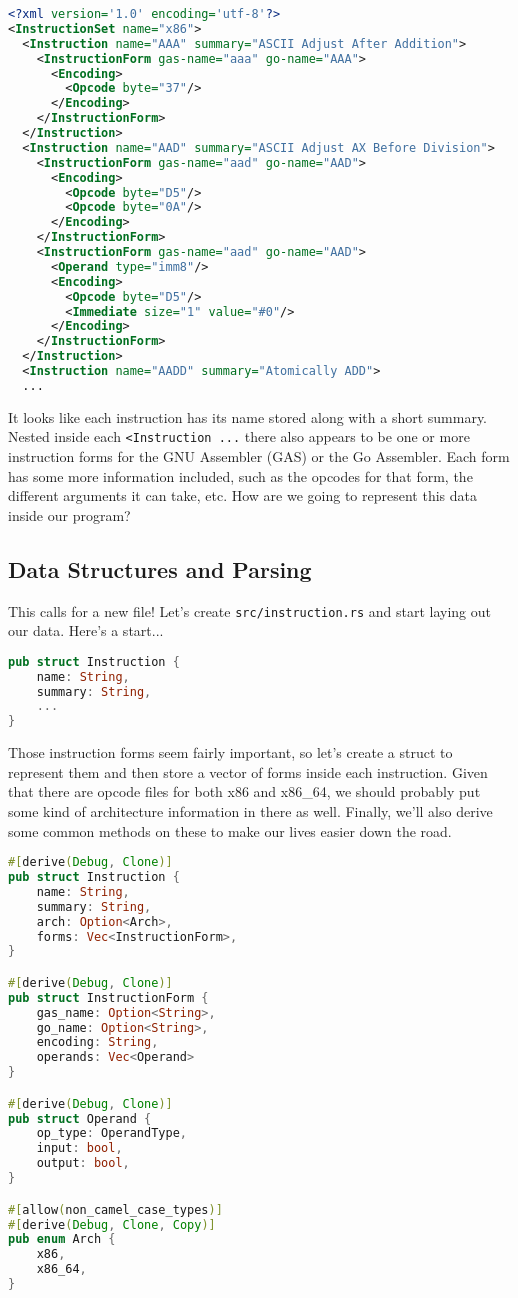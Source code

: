 \begin{lstlisting}[language=xml]
<?xml version='1.0' encoding='utf-8'?>
<InstructionSet name="x86">
  <Instruction name="AAA" summary="ASCII Adjust After Addition">
    <InstructionForm gas-name="aaa" go-name="AAA">
      <Encoding>
        <Opcode byte="37"/>
      </Encoding>
    </InstructionForm>
  </Instruction>
  <Instruction name="AAD" summary="ASCII Adjust AX Before Division">
    <InstructionForm gas-name="aad" go-name="AAD">
      <Encoding>
        <Opcode byte="D5"/>
        <Opcode byte="0A"/>
      </Encoding>
    </InstructionForm>
    <InstructionForm gas-name="aad" go-name="AAD">
      <Operand type="imm8"/>
      <Encoding>
        <Opcode byte="D5"/>
        <Immediate size="1" value="#0"/>
      </Encoding>
    </InstructionForm>
  </Instruction>
  <Instruction name="AADD" summary="Atomically ADD">
  ...
\end{lstlisting}

It looks like each instruction has its name stored along with 
a short summary. Nested inside each \texttt{<Instruction ...} there also appears
to be one or more instruction forms for the GNU Assembler (GAS) or the Go Assembler.
Each form has some more information included, such as the opcodes for that form,
the different arguments it can take, etc. How are we going to represent this data
inside our program?

\subsection{Data Structures and Parsing}

This calls for a new file! Let's create \texttt{src/instruction.rs} and start 
laying out our data. Here's a start...

\begin{lstlisting}[language=rust]
pub struct Instruction {
    name: String,
    summary: String,
    ...
}
\end{lstlisting}

Those instruction forms seem fairly important, so let's create a struct to represent
them and then store a vector of forms inside each instruction. Given that there
are opcode files for both x86 and x86\_64, we should probably put some kind of
architecture information in there as well. Finally, we'll also derive some common
methods on these to make our lives easier down the road.

\begin{lstlisting}[language=rust]
#[derive(Debug, Clone)]
pub struct Instruction {
    name: String,
    summary: String,
    arch: Option<Arch>,
    forms: Vec<InstructionForm>,
}

#[derive(Debug, Clone)]
pub struct InstructionForm {
    gas_name: Option<String>,
    go_name: Option<String>,
    encoding: String,
    operands: Vec<Operand>
}

#[derive(Debug, Clone)]
pub struct Operand {
    op_type: OperandType,
    input: bool,
    output: bool,
}

#[allow(non_camel_case_types)]
#[derive(Debug, Clone, Copy)]
pub enum Arch {
    x86,
    x86_64,
}
\end{lstlisting}

